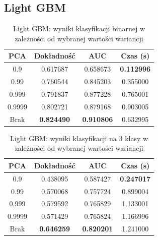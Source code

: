 \documentclass[a4paper, twoside, 11pt, openright]{article}
\begin{document}
\subsection{Light GBM}

\begin{table}[H]
    \centering
    \begin{tabular}{|c|c|c|c|}
    \hline
        \textbf{PCA} & \textbf{Dokładność} & \textbf{AUC} & \textbf{Czas (s)} \\ \hline
0.9                &  0.617687 &  0.658673 &    \textbf{0.112996} \\ \hline
0.99               &  0.760544 &  0.845203 &    0.355000 \\ \hline
0.999    &  0.791837 &  0.877228 &    0.765001 \\ \hline
0.9999             &  0.802721 &  0.879168 &    0.903005 \\ \hline
Brak                &  \textbf{0.824490} &  \textbf{0.910806} &    0.632995 \\ \hline
    \end{tabular}
    \caption{Light GBM: wyniki klasyfikacji binarnej w zależności od wybranej wartości wariancji}
    \label{tab:lgbm_pca_binary}
\end{table}

\begin{table}[H]
    \centering
    \begin{tabular}{|c|c|c|c|}
    \hline
        \textbf{PCA} & \textbf{Dokładność} & \textbf{AUC} & \textbf{Czas (s)} \\ \hline
0.9                &  0.438095 &  0.587427 &    \textbf{0.247017} \\  \hline
0.99               &  0.570068 &  0.757724 &    0.899004 \\ \hline
0.999 &  0.579592 &  0.765829 &    1.133001 \\ \hline
0.9999             &  0.571429 &  0.765824 &    1.166996 \\ \hline
Brak                &  \textbf{0.646259} &  \textbf{0.820201} &    1.241000 \\ \hline
    \end{tabular}
    \caption{Light GBM: wyniki klasyfikacji na 3 klasy w zależności od wybranej wartości wariancji}
    \label{tab:lgbm_pca_discrete}
\end{table}
\end{document}
